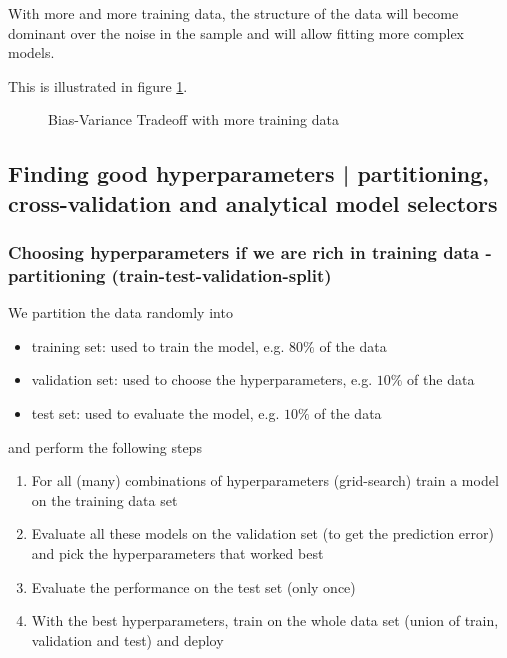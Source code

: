 With more and more training data, the structure of the data will become dominant over 
the noise in the sample and will allow fitting more complex models.

This is illustrated in figure \ref{fig:bias_variance_tradeoffB}.

\begin{figure}[!htb]
    \centering
    
    \caption{Bias-Variance Tradeoff with more training data}
    \label{fig:bias_variance_tradeoffB}
\end{figure}

\subsection{Finding good hyperparameters | partitioning, cross-validation and analytical
model selectors}
\subsubsection{Choosing hyperparameters if we are rich in training data - partitioning (train-test-validation-split)}
We partition the data randomly into
\begin{itemize}
    \item \textcolor{blue1}{training set}: used to train the model, e.g. $80\%$ of the data
    \item \textcolor{blue1}{validation set}: used to choose the hyperparameters, e.g. $10\%$ of the data
    \item \textcolor{blue1}{test set}: used to evaluate the model, e.g. $10\%$ of the data
\end{itemize}
and perform the following steps
\begin{enumerate}
    \item For all (many) combinations of hyperparameters (grid-search) train a model on the training data set
    \item Evaluate all these models on the validation set (to get the prediction error) and pick the hyperparameters that worked best
    \item Evaluate the performance on the test set (only once)
    \item With the best hyperparameters, train on the whole data set (union of train, validation and test) and deploy
\end{enumerate}


